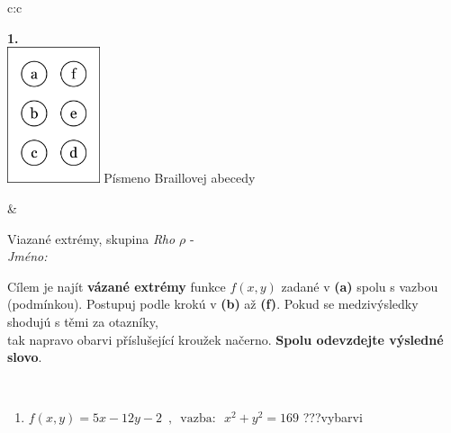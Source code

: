 \documentclass[10pt]{report}
\begin{document}
\begin{tabular}{c:c}
\begin{minipage}[c][104.5mm][t]{0.5\linewidth}
\begin{center}
\begin{minipage}{0.79\linewidth}
\begin{center}
\begin{varwidth}{\linewidth}
\begin{enumerate}
\end{enumerate}
\end{varwidth}
\end{center}
\end{minipage}
\begin{minipage}{0.20\linewidth}
\begin{center}
{\Huge\bfseries 1.} \\[2mm]
\includegraphics[height=40mm]{../images/braille.png}
{\small Písmeno Braillovej abecedy}
\end{center}
\end{minipage}
\end{center}
\end{minipage}
&
\begin{minipage}[c][104.5mm][t]{0.5\linewidth}
\begin{center}
\vspace{7mm}
{\huge Viazané extrémy, skupina \textit{Rho $\rho$} -}\\[5mm]
\textit{Jméno:}\phantom{xxxxxxxxxxxxxxxxxxxxxxxxxxxxxxxxxxxxxxxxxxxxxxxxxxxxxxxxxxxxxxxxx}\\[5mm]
\begin{minipage}{0.95\linewidth}
\begin{center}
Cílem je najít \textbf{vázané extrémy} funkce $f(x,y)$ zadané v \textbf{(a)} spolu s vazbou (podmínkou). Postupuj podle krokú v \textbf{(b)} až \textbf{(f)}. Pokud se medzivýsledky shodujú s těmi za otazníky,\\tak napravo obarvi příslušející kroužek načerno. \textbf{Spolu odevzdejte výsledné slovo}.
\end{center}
\end{minipage}
\\[1mm]
\begin{minipage}{0.79\linewidth}
\begin{center}
\begin{varwidth}{\linewidth}
\begin{enumerate}
\normalsize
\item $f(x,y)=5x-12y-2 \enspace , \enspace \mathrm{vazba:} \enspace x^2+y^2=169$\quad \dotfill\; ???\;\dotfill \quad vybarvi

\end{enumerate}
\end{varwidth}
\end{center}
\end{minipage}
\end{center}
\end{minipage}
\end{tabular}
\end{document}
